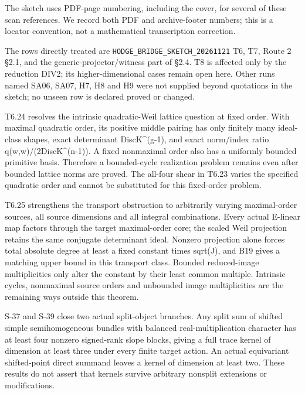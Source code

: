 \documentclass[11pt,a4paper]{article}
\theoremstyle{definition}
\begin{document}
The sketch uses PDF-page numbering, including the cover, for several of
these scan references. We record both PDF and archive-footer numbers;
this is a locator convention, not a mathematical transcription
correction.

The rows directly treated are \texttt{HODGE\_BRIDGE\_SKETCH\_20261121}
T6, T7, Route 2 §2.1, and the generic-projector/witness part of §2.4. T8
is affected only by the reduction DIV2; its higher-dimensional cases
remain open here. Other runs named SA06, SA07, H7, H8 and H9 were not
supplied beyond quotations in the sketch; no unseen row is declared
proved or changed.

T6.24 resolves the intrinsic quadratic-Weil lattice question at fixed
order. With maximal quadratic order, its positive middle pairing has
only finitely many ideal-class shapes, exact determinant
\textbar DiscK\textbar\^{}(g-1), and exact norm/index ratio
q(w,w)/(2\textbar DiscK\textbar\^{}(n-1)). A fixed nonmaximal order also
has a uniformly bounded primitive basis. Therefore a bounded-cycle
realization problem remains even after bounded lattice norms are proved.
The all-four shear in T6.23 varies the specified quadratic order and
cannot be substituted for this fixed-order problem.

T6.25 strengthens the transport obstruction to arbitrarily varying
maximal-order sources, all source dimensions and all integral
combinations. Every actual E-linear map factors through the target
maximal-order core; the scaled Weil projection retains the same
conjugate determinant ideal. Nonzero projection alone forces total
absolute degree at least a fixed constant times sqrt(J), and B19 gives a
matching upper bound in this transport class. Bounded reduced-image
multiplicities only alter the constant by their least common multiple.
Intrinsic cycles, nonmaximal source orders and unbounded image
multiplicities are the remaining ways outside this theorem.

S-37 and S-39 close two actual split-object branches. Any split sum of
shifted simple semihomogeneous bundles with balanced real-multiplication
character has at least four nonzero signed-rank slope blocks, giving a
full trace kernel of dimension at least three under every finite target
action. An actual equivariant shifted-point direct summand leaves a
kernel of dimension at least two. These results do not assert that
kernels survive arbitrary nonsplit extensions or modifications.
\end{document}
